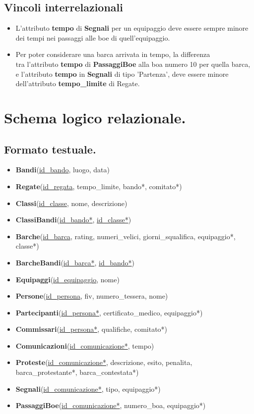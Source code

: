 \documentclass{article}
\begin{document}
\subsection{Vincoli interrelazionali}

\begin{itemize}
    \item L'attributo \textbf{tempo} di \textbf{Segnali} per un equipaggio deve essere sempre minore dei tempi nei passaggi alle boe di quell'equipaggio.
    \item Per poter considerare una barca arrivata in tempo, la differenza \\tra l'attributo \textbf{tempo} di \textbf{PassaggiBoe} alla boa numero 10 per quella barca, e l'attributo \textbf{tempo} in \textbf{Segnali} di tipo 'Partenza', deve essere minore dell'attributo \textbf{tempo\_limite} di Regate.
\end{itemize}

\newpage
\section{Schema logico relazionale.}

\subsection{Formato testuale.}

\begin{itemize}
    \item \textbf{Bandi}(\underline{id\_bando}, luogo, data)
    \item \textbf{Regate}(\underline{id\_regata}, tempo\_limite, bando*, comitato*)
    \item \textbf{Classi}(\underline{id\_classe}, nome, descrizione)
    \item \textbf{ClassiBandi}(\underline{id\_bando*}, \underline{id\_classe*})
    \item \textbf{Barche}(\underline{id\_barca}, rating, numeri\_velici, giorni\_squalifica, equipaggio*, classe*)
    \item \textbf{BarcheBandi}(\underline{id\_barca*}, \underline{id\_bando*})
    \item \textbf{Equipaggi}(\underline{id\_equipaggio}, nome)
    \item \textbf{Persone}(\underline{id\_persona}, fiv, numero\_tessera, nome)
    \item \textbf{Partecipanti}(\underline{id\_persona*}, certificato\_medico, equipaggio*)
    \item \textbf{Commissari}(\underline{id\_persona*}, qualifiche, comitato*)
    \item \textbf{Comunicazioni}(\underline{id\_comunicazione*}, tempo)
    \item \textbf{Proteste}(\underline{id\_comunicazione*}, descrizione, esito, penalita, barca\_protestante*, \newline barca\_contestata*)
    \item \textbf{Segnali}(\underline{id\_comunicazione*}, tipo, equipaggio*)
    \item \textbf{PassaggiBoe}(\underline{id\_comunicazione*}, numero\_boa, equipaggio*)
\end{itemize}
\end{document}
